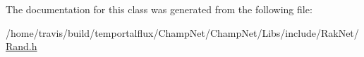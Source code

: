 The documentation for this class was generated from the following file\-:\begin{DoxyCompactItemize}
\item 
/home/travis/build/temportalflux/\-Champ\-Net/\-Champ\-Net/\-Libs/include/\-Rak\-Net/\hyperlink{_rand_8h}{Rand.\-h}\end{DoxyCompactItemize}
